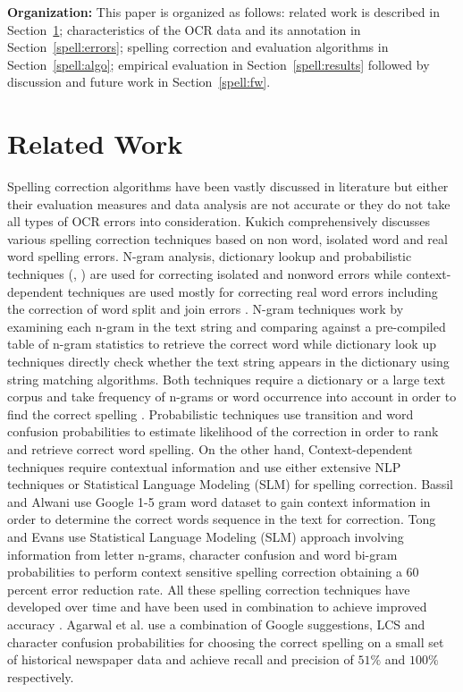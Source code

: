 \documentclass[preprint,11pt]{elsarticle}
\begin{document}
\noindent \textbf{Organization: } This paper is organized as follows: related work is described in Section~\ref{spell:rw}; characteristics of the OCR data and its annotation in Section~\ref{spell:errors}; spelling correction and evaluation algorithms in Section~\ref{spell:algo}; empirical evaluation in Section~\ref{spell:results} followed by discussion and future work in Section~\ref{spell:fw}. 

\section{Related Work}
\label{spell:rw}

Spelling correction algorithms have been vastly discussed in literature but either their evaluation measures and data analysis are not accurate or they do not take all types of OCR errors into consideration.
Kukich\cite{kukich1992techniques} comprehensively discusses various spelling correction techniques based on non word, isolated word and real word spelling errors. N-gram analysis, dictionary lookup and probabilistic techniques (\cite{strohmaier2003lexical}, \cite{ringlstetter2007text}) are used for correcting isolated and nonword errors while context-dependent techniques are used mostly for correcting real word errors including the correction of word split and join errors \cite{elmi1998spelling}.
N-gram techniques work by examining each n-gram in the text string and comparing against a pre-compiled table of n-gram statistics to retrieve the correct word while dictionary look up techniques directly check whether the text string appears in the dictionary using string matching algorithms. Both techniques require a dictionary or a large text corpus and take frequency of n-grams or word occurrence into account in order to find the correct spelling .
Probabilistic techniques use transition and word confusion probabilities to estimate likelihood of the correction in order to rank and retrieve correct word spelling.
On the other hand, Context-dependent techniques require contextual information and use either extensive NLP techniques or Statistical Language Modeling (SLM) for spelling correction.
Bassil and Alwani\cite{bassil2012ocr} use Google 1-5 gram word dataset to gain context information in order to determine the correct words sequence in the text for correction.
Tong and Evans\cite{tong1996statistical} use Statistical Language Modeling (SLM) approach involving information from letter n-grams, character confusion and word bi-gram probabilities to perform context sensitive spelling correction obtaining a 60 percent error reduction rate. All these spelling correction techniques have developed over time and have been used in combination to achieve improved accuracy \cite{brill2000improved}. Agarwal et al.\cite{agarwal2013utilizing} use a combination of Google suggestions, LCS and character confusion probabilities for choosing the correct spelling on a small set of historical newspaper data and achieve recall and precision of $51\%$ and $100\%$ respectively.
\end{document}
